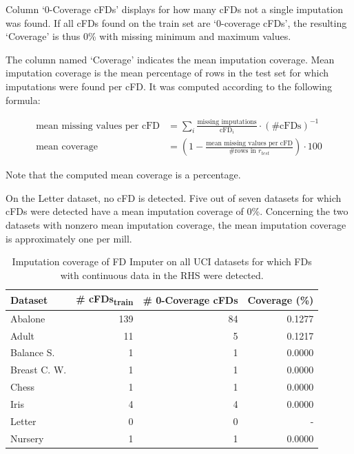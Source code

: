 Column `0-Coverage cFDs' displays for how many cFDs not a single imputation was found.
If all cFDs found on the train set are `0-coverage cFDs', the resulting `Coverage' is thus 0\% with missing minimum and maximum values.

The column named `Coverage' indicates the mean imputation coverage.
Mean imputation coverage is the mean percentage of rows in the test set for which imputations were found per cFD.
It was computed according to the following formula:

\begin{align*}
    \text{mean missing values per cFD} &= \sum_{i} \frac{\text{missing imputations}}{\text{cFD}_i} \cdot \left(\text{\# cFDs}\right)^{-1} \\
    \text{mean coverage} &= \left( 1 - \frac{\text{mean missing values per cFD}}{\text{\# rows in }r_{test}} \right) \cdot 100
\end{align*}

Note that the computed mean coverage is a percentage.

On the Letter dataset, no cFD is detected.
Five out of seven datasets for which cFDs were detected have a mean imputation coverage of 0\%.
Concerning the two datasets with nonzero mean imputation coverage, the mean imputation coverage is approximately one per mill.

\begin{table}[ht]
    \centering
    \begin{tabular}{lrrr}
        \toprule
        \toprule
        Dataset & \# cFDs\textsubscript{train} & \# 0-Coverage cFDs  & Coverage (\%) \\
        \midrule
        Abalone & 139 & 84 & 0.1277 \\
        Adult & 11 & 5 & 0.1217 \\
        Balance S. & 1 & 1 & 0.0000 \\
        Breast C. W. & 1 & 1 & 0.0000 \\
        Chess & 1 & 1 & 0.0000 \\
        Iris & 4 & 4 & 0.0000 \\
        Letter & 0 & 0 & - \\
        Nursery & 1 & 1 & 0.0000 \\
        \bottomrule
        \bottomrule
    \end{tabular}
    \caption{Imputation coverage of FD Imputer on all UCI datasets for which FDs with continuous data in the RHS were detected.}\label{tab:fd-imputer-mse}
\end{table}

